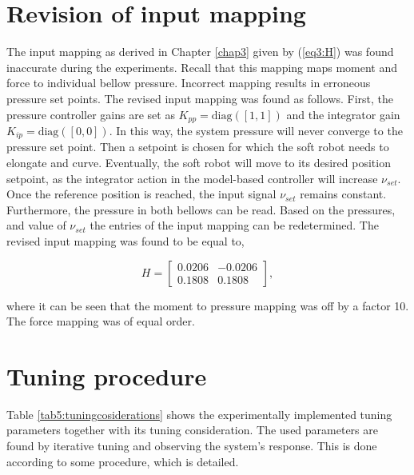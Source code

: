 \section{Revision of input mapping}

The input mapping as derived in Chapter \ref{chap3} given by (\ref{eq3:H}) was found inaccurate during the experiments. Recall that this mapping maps moment and force to individual bellow pressure. Incorrect mapping results in erroneous pressure set points. The revised input mapping was found as follows. First, the pressure controller gains are set as $K_{pp} =\text{diag}([1,1])$ and the integrator gain $K_{ip} = \text{diag}([0,0])$. In this way, the system pressure will never converge to the pressure set point. Then a setpoint is chosen for which the soft robot needs to elongate and curve. Eventually, the soft robot will move to its desired position setpoint, as the integrator action in the model-based controller will increase $\nu_{set}$. Once the reference position is reached, the input signal $\nu_{set}$ remains constant. Furthermore, the pressure in both bellows can be read. Based on the pressures, and value of $\nu_{set}$ the entries of the input mapping can be redetermined. The revised input mapping was found to be equal to,

\begin{equation}
    H = \begin{bmatrix} 	0.0206 &  -0.0206 \\ 
	0.1808 & 0.1808 \end{bmatrix},
    \label{eq4:revisedH}
\end{equation}

where it can be seen that the moment to pressure mapping was off by a factor 10. The force mapping was of equal order. 

\section{Tuning procedure}


Table \ref{tab5:tuningcosiderations} shows the experimentally implemented tuning parameters together with its tuning consideration. The used parameters are found by iterative tuning and observing the system's response. This is done according to some procedure, which is detailed.

